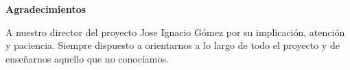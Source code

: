 \newpage
\begin{center}
{\bf \Huge Agradecimientos}
\end{center}
\vspace{1cm}
\setlength{\baselineskip}{0.8cm}

A nuestro director del proyecto Jose Ignacio Gómez por su implicación, atención y paciencia. Siempre dispuesto a orientarnos a lo largo de todo el proyecto y de enseñarnos aquello que no conocíamos.


